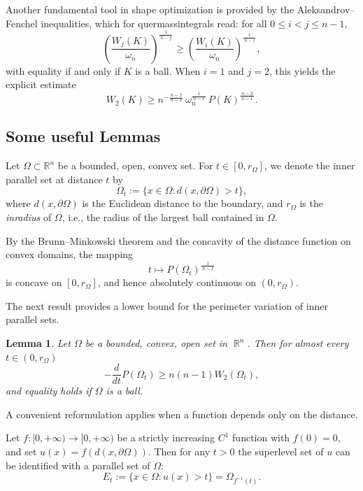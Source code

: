 \documentclass[oneside,a4paper,11pt,notitlepage]{article}
\theoremstyle{plain}
\numberwithin{teor}{section}
\numberwithin{equation}{section}
\theoremstyle{definition}
\theoremstyle{plain}
\newtheorem{lemma}[lemma]{Lemma}
\theoremstyle{plain}
\theoremstyle{plain}
\theoremstyle{plain}
\theoremstyle{definition}
\theoremstyle{definition}
\theoremstyle{plain}
\DeclareMathOperator{\R}{\mathbb{R}}
\begin{document}
Another fundamental tool in shape optimization is provided by the
Aleksandrov–Fenchel inequalities, which for quermassintegrals read:
for all $0 \le i < j \le n-1$,
\begin{equation}
\label{Aleksandrov_Fenchel}
\left(\frac{W_j(K)}{\omega_n}\right)^{\frac{1}{\,n-j\,}}
\ge
\left(\frac{W_i(K)}{\omega_n}\right)^{\frac{1}{\,n-i\,}},
\end{equation}
with equality if and only if $K$ is a ball. When $i=1$ and $j=2$, this yields the
explicit estimate
\begin{equation}
\label{AF_W2}
W_2(K) \ge
n^{-\frac{n-2}{\,n-1\,}}\, \omega_n^{\frac{1}{\,n-1\,}}\,
P(K)^{\frac{n-2}{\,n-1\,}}.
\end{equation}

\subsection{Some useful Lemmas}

Let $\Omega \subset \mathbb{R}^n$ be a bounded, open, convex set.
For $t \in [0,r_\Omega]$, we denote the inner parallel set at distance $t$ by
\[
\Omega_t := \{x \in \Omega : d(x,\partial\Omega) > t\},
\]
where $d(x,\partial\Omega)$ is the Euclidean distance to the boundary, and
$r_\Omega$ is the \emph{inradius} of $\Omega$, i.e., the radius of the largest ball
contained in $\Omega$.

By the Brunn–Minkowski theorem and the concavity of the distance function on
convex domains, the mapping
\[
t \mapsto P(\Omega_t)^{\frac{1}{\,n-1\,}}
\]
is concave on $[0,r_\Omega]$, and hence absolutely continuous on
$(0,r_\Omega)$.

The next result provides a lower bound for the perimeter variation of inner
parallel sets.
\begin{lemma}
    \label{lemma_derivata_perimetro_1}
    Let $\Omega$ be a bounded, convex, open set in $\R^n$. Then for almost every $t \in (0,r_{\Omega})$
    \begin{equation}
    \label{eq_lemma_1}
        -\frac{d}{dt} P(\Omega_t) \geq n(n-1) W_2(\Omega_t),
    \end{equation}
    and equality holds if $\Omega$ is a ball.
    \end{lemma}
A convenient reformulation applies when a function depends only on the
distance.

Let $f:[0,+\infty)\to[0,+\infty)$ be a strictly increasing $C^1$ function
with $f(0)=0$, and set $u(x)=f(d(x,\partial\Omega))$. Then for any $t>0$
the superlevel set of $u$ can be identified with a parallel set of $\Omega$:
\[
E_t := \{x\in\Omega : u(x)>t\} = \Omega_{f^{-1}(t)}.
\]
\end{document}
